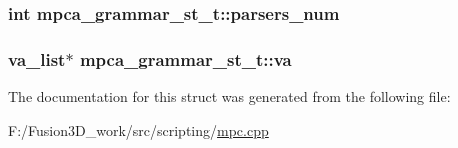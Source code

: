 \subsubsection[{parsers\+\_\+num}]{\setlength{\rightskip}{0pt plus 5cm}int mpca\+\_\+grammar\+\_\+st\+\_\+t\+::parsers\+\_\+num}\label{structmpca__grammar__st__t_a765a51c2b312dd68d7667ceb2b265603}
\hypertarget{structmpca__grammar__st__t_a08c5f07414915aaa72c44022dd134a4b}{}
\subsubsection[{va}]{\setlength{\rightskip}{0pt plus 5cm}va\+\_\+list$\ast$ mpca\+\_\+grammar\+\_\+st\+\_\+t\+::va}\label{structmpca__grammar__st__t_a08c5f07414915aaa72c44022dd134a4b}


The documentation for this struct was generated from the following file\+:\begin{DoxyCompactItemize}
\item 
F\+:/\+Fusion3\+D\+\_\+work/src/scripting/\hyperlink{mpc_8cpp}{mpc.\+cpp}\end{DoxyCompactItemize}

